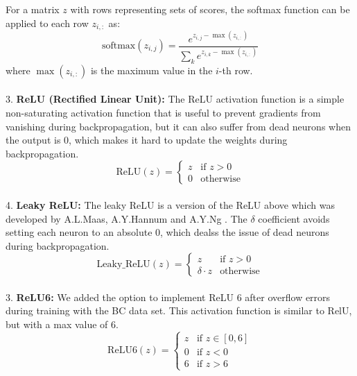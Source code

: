 For a matrix \( z \) with rows representing sets of scores, the softmax function can be applied to each row \( z_{i,:} \) as:
\[
\text{softmax}(z_{i,j}) = \frac{e^{z_{i,j} - \max(z_{i,:})}}{\sum_{k} e^{z_{i,k} - \max(z_{i,:})}}
\]
where \( \max(z_{i,:}) \) is the maximum value in the \( i \)-th row.
\\
\\
3. \textbf{ReLU (Rectified Linear Unit):}
The ReLU activation function is a simple non-saturating activation function that is useful to prevent gradients from vanishing during backpropagation, 
but it can also suffer from dead neurons when the output is 0, which makes it hard to update the weights during backpropagation.  
\[
\text{ReLU}(z) = 
\begin{cases} 
   z & \text{if } z > 0 \\
   0 & \text{otherwise}
\end{cases}
\]
\\
4. \textbf{Leaky ReLU:}
The leaky ReLU is a version of the ReLU above which was developed by A.L.Maas, A.Y.Hannum and A.Y.Ng \cite{relu_best_ever}. The $\delta$ coefficient avoids
setting each neuron to an absolute 0, which dealss the issue of dead neurons during backpropagation.
\[
\text{Leaky\_ReLU}(z) = 
\begin{cases} 
   z & \text{if } z > 0 \\
   \delta \cdot z & \text{otherwise}
\end{cases}
\]
\\
3. \textbf{ReLU6:}
We added the option to implement ReLU 6 after overflow errors during training with the BC data set. This activation
function is similar to RelU, but with a max value of 6. 
\[
\text{ReLU6}(z) = 
\begin{cases} 
   z & \text{if } z \in [0, 6] \\
   0 & \text{if } z < 0 \\
   6 & \text{if } z > 6
\end{cases}
\]
\\


